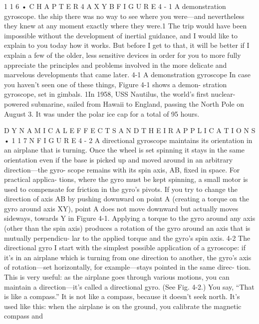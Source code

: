 \documentclass[10pt,oneside]{article}
\begin{document}
1 1 6 • C H A P T E R  4 A X Y B F I G U R E  4 - 1 A demonstration gyroscope. the ship there was no way to see where you were---and nevertheless they knew at any moment exactly where they were.1 The trip would have been impossible without the development of inertial guidance, and I would like to explain to you today how it works. But before I get to that, it will be better if I explain a few of the older, less sensitive devices in order for you to more fully appreciate the principles and problems involved in the more delicate and marvelous developments that came later. 4-1 A demonstration gyroscope In case you haven’t seen one of these things, Figure 4-1 shows a demon- stration gyroscope, set in gimbals. 1In 1958, USS Nautilus, the world’s first nuclear-powered submarine, sailed from Hawaii to England, passing the North Pole on August 3. It was under the polar ice cap for a total of 95 hours.\par

D Y N A M I C A L  E F F E C T S  A N D  T H E I R  A P P L I C A T I O N S • 1 1 7 N F I G U R E  4 - 2 A directional gyroscope maintains its orientation in an airplane that is turning. Once the wheel is set spinning it stays in the same orientation even if the base is picked up and moved around in an arbitrary direction---the gyro- scope remains with its spin axis, AB, fixed in space. For practical applica- tions, where the gyro must be kept spinning, a small motor is used to compensate for friction in the gyro’s pivots. If you try to change the direction of axis AB by pushing downward on point A (creating a torque on the gyro around axis XY), point A does not move downward but actually moves sideways, towards Y in Figure 4-1. Applying a torque to the gyro around any axis (other than the spin axis) produces a rotation of the gyro around an axis that is mutually perpendicu- lar to the applied torque and the gyro’s spin axis. 4-2 The directional gyro I start with the simplest possible application of a gyroscope: if it’s in an airplane which is turning from one direction to another, the gyro’s axis of rotation---set horizontally, for example---stays pointed in the same direc- tion. This is very useful: as the airplane goes through various motions, you can maintain a direction---it’s called a directional gyro. (See Fig. 4-2.) You say, “That is like a compass.” It is not like a compass, because it doesn’t seek north. It’s used like this: when the airplane is on the ground, you calibrate the magnetic compass and\par
\end{document}
